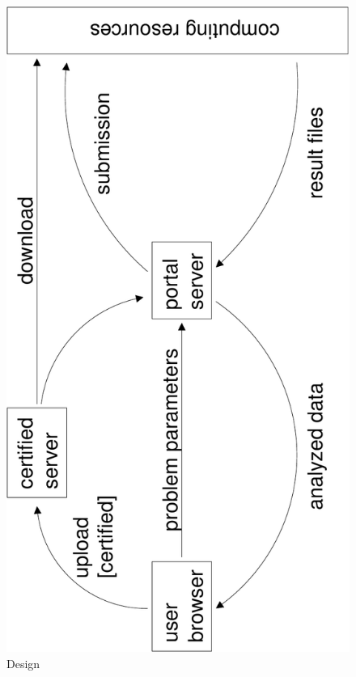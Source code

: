 \documentclass[11pt,relax]{SANDreport}
\begin{document}
\begin{figure}
\begin{center}
\includegraphics[width=14cm]{portal_design}
\caption{Design}
\end{center}
\label{fig:design}
\end{figure}

\end{document}
